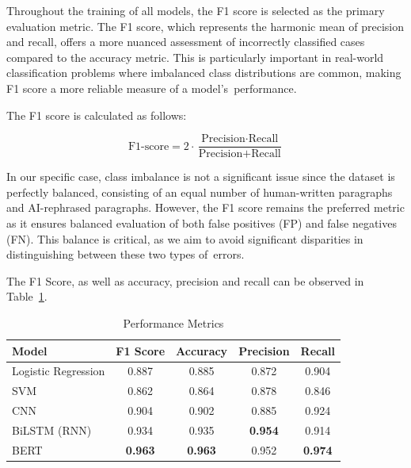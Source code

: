 Throughout the training of all models, the F1 score is selected as the primary evaluation metric. The F1 score, which represents the harmonic mean of precision and recall, offers a more nuanced assessment of incorrectly classified cases compared to the accuracy metric. This is particularly important in real-world classification problems where imbalanced class distributions are common, making F1 score a more reliable measure of a model’s~performance. 

\vspace{3mm}

The F1 score is calculated as follows:

\vspace{3mm}

\[
\text{F1-score} = 2 \cdot \frac{\text{Precision} \cdot \text{Recall}}{\text{Precision} + \text{Recall}}
\]

\vspace{3mm}

In our specific case, class imbalance is not a significant issue since the dataset is perfectly balanced, consisting of an equal number of human-written paragraphs and AI-rephrased paragraphs. However, the F1 score remains the preferred metric as it ensures balanced evaluation of both false positives (FP) and false negatives (FN). This balance is critical, as we aim to avoid significant disparities in distinguishing between these two types of~errors.

\vspace{3mm}

\noindent The F1 Score, as well as accuracy, precision and recall can be observed in Table~\ref{tab:performance-metrics}.

\vspace{3mm}

\begin{table}[h!]
    \centering
    \begin{tabular}{@{}lcccc@{}}
        \toprule
        \textbf{Model}            & \textbf{F1 Score} & \textbf{Accuracy} & \textbf{Precision} & \textbf{Recall} \\ \midrule
        Logistic Regression       & 0.887             & 0.885             & 0.872              & 0.904           \\
        SVM                       & 0.862             & 0.864             & 0.878              & 0.846           \\
        CNN                       & 0.904             & 0.902             & 0.885              & 0.924           \\
        BiLSTM (RNN)              & 0.934             & 0.935             & \textbf{0.954}     & 0.914           \\
        BERT                      & \textbf{0.963}    & \textbf{0.963}    & 0.952              & \textbf{0.974}  \\ \bottomrule
    \end{tabular}
    \caption{Performance Metrics}
    \label{tab:performance-metrics}
\end{table}

